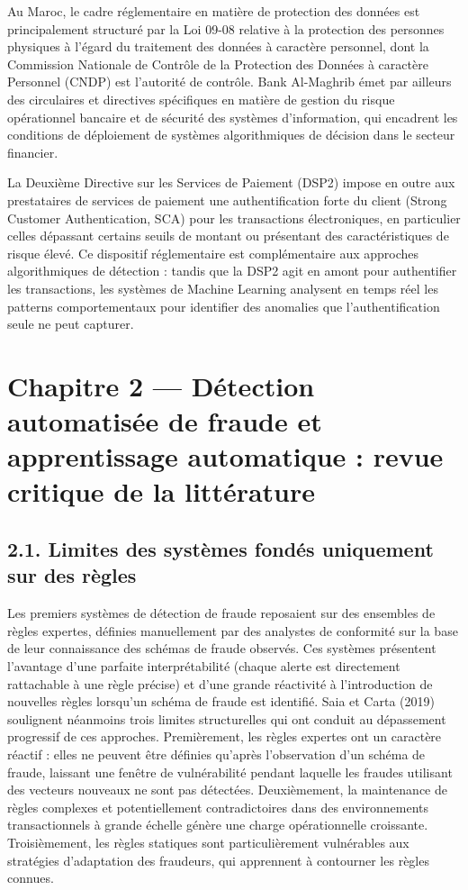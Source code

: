 Au Maroc, le cadre réglementaire en matière de protection des données est principalement structuré par la Loi 09-08 relative à la protection des personnes physiques à l'égard du traitement des données à caractère personnel, dont la Commission Nationale de Contrôle de la Protection des Données à caractère Personnel (CNDP) est l'autorité de contrôle. Bank Al-Maghrib émet par ailleurs des circulaires et directives spécifiques en matière de gestion du risque opérationnel bancaire et de sécurité des systèmes d'information, qui encadrent les conditions de déploiement de systèmes algorithmiques de décision dans le secteur financier.

La Deuxième Directive sur les Services de Paiement (DSP2) impose en outre aux prestataires de services de paiement une authentification forte du client (Strong Customer Authentication, SCA) pour les transactions électroniques, en particulier celles dépassant certains seuils de montant ou présentant des caractéristiques de risque élevé. Ce dispositif réglementaire est complémentaire aux approches algorithmiques de détection : tandis que la DSP2 agit en amont pour authentifier les transactions, les systèmes de Machine Learning analysent en temps réel les patterns comportementaux pour identifier des anomalies que l'authentification seule ne peut capturer.

\chapter{Chapitre 2 — Détection automatisée de fraude et apprentissage automatique : revue critique de la littérature}

\section{2.1. Limites des systèmes fondés uniquement sur des règles}

Les premiers systèmes de détection de fraude reposaient sur des ensembles de règles expertes, définies manuellement par des analystes de conformité sur la base de leur connaissance des schémas de fraude observés. Ces systèmes présentent l'avantage d'une parfaite interprétabilité (chaque alerte est directement rattachable à une règle précise) et d'une grande réactivité à l'introduction de nouvelles règles lorsqu'un schéma de fraude est identifié. Saia et Carta (2019) soulignent néanmoins trois limites structurelles qui ont conduit au dépassement progressif de ces approches. Premièrement, les règles expertes ont un caractère réactif : elles ne peuvent être définies qu'après l'observation d'un schéma de fraude, laissant une fenêtre de vulnérabilité pendant laquelle les fraudes utilisant des vecteurs nouveaux ne sont pas détectées. Deuxièmement, la maintenance de règles complexes et potentiellement contradictoires dans des environnements transactionnels à grande échelle génère une charge opérationnelle croissante. Troisièmement, les règles statiques sont particulièrement vulnérables aux stratégies d'adaptation des fraudeurs, qui apprennent à contourner les règles connues.

